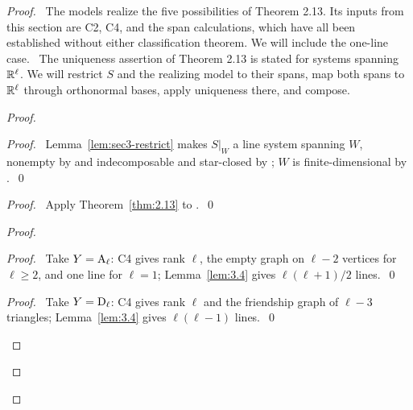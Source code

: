 \begin{proof}
 \pfsketch\ The models realize the five possibilities of Theorem 2.13. Its inputs
 from this section are C2, C4, and the span calculations, which have all been
 established without either classification theorem. We will include the one-line case.
 \new\ The uniqueness assertion of Theorem 2.13 is stated for systems spanning
 ${\mathbb R}^\ell$. We will restrict $S$ and the realizing model to their spans, map both spans
 to ${\mathbb R}^\ell$ through orthonormal bases, apply uniqueness there, and compose.
 \begin{proof}
  \begin{proof}\pf\ Lemma~\ref{lem:sec3-restrict} makes $S|_W$ a line system spanning
   $W$, nonempty by  and indecomposable and star-closed by ; $W$ is
   finite-dimensional by .~\qed\end{proof}
  \begin{proof}\pf\ Apply Theorem~\ref{thm:2.13} to .~\qed\end{proof}
  \begin{proof}
   \begin{proof}\pf\ Take $Y=\mathrm{A}_\ell$: C4 gives rank $\ell$, the empty graph on
    $\ell-2$ vertices for $\ell\geq2$, and one line for $\ell=1$; Lemma~\ref{lem:3.4}
    gives $\ell(\ell+1)/2$ lines.~\qed\end{proof}
   \begin{proof}\pf\ Take $Y=\mathrm{D}_\ell$: C4 gives rank $\ell$ and the friendship graph
    of $\ell-3$ triangles; Lemma~\ref{lem:3.4} gives $\ell(\ell-1)$ lines.~\qed\end{proof}

\end{proof}
\end{proof}
\end{proof}
